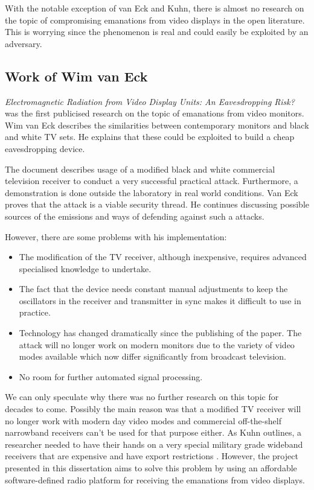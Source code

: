 \documentclass[a4paper,12pt,twoside,openright]{report}
\begin{document}
With the notable exception of van Eck and Kuhn, there is almost no research on the topic of compromising emanations from video displays in the open literature. This is worrying since the phenomenon is real and could easily be exploited by an adversary.

\subsection{Work of Wim van Eck}

\textit{Electromagnetic Radiation from Video Display Units: An Eavesdropping Risk?} \cite{van1985electromagnetic} was the first publicised research on the topic of emanations from video monitors. Wim van Eck describes the similarities between contemporary monitors and black and white TV sets. He explains that these could be exploited to build a cheap eavesdropping device.

The document describes usage of a modified black and white commercial television receiver to conduct a very successful practical attack. Furthermore, a demonstration is done outside the laboratory in real world conditions. Van Eck proves that the attack is a viable security thread. He continues discussing possible sources of the emissions and ways of defending against such a attacks.

However, there are some problems with his implementation:

\begin{itemize}

  \item The modification of the TV receiver, although inexpensive, requires advanced specialised knowledge to undertake.
  \item The fact that the device needs constant manual adjustments to keep the oscillators in the receiver and transmitter in sync makes it difficult to use in practice.
  \item Technology has changed dramatically since the publishing of the paper. The attack will no longer work on modern monitors due to the variety of video modes available which now differ significantly from broadcast television. 
  \item No room for further automated signal processing.

\end{itemize}

We can only speculate why there was no further research on this topic for decades to come. Possibly the main reason was that a modified TV receiver will no longer work with modern day video modes and commercial off-the-shelf narrowband receivers can't be used for that purpose either. As Kuhn outlines, a researcher needed to have their hands on a very special military grade wideband receivers that are expensive and have export restrictions \cite{kuhn2003compromising}. However, the project presented in this dissertation aims to solve this problem by using an affordable software-defined radio platform for receiving the emanations from video displays.
 
\end{document}
